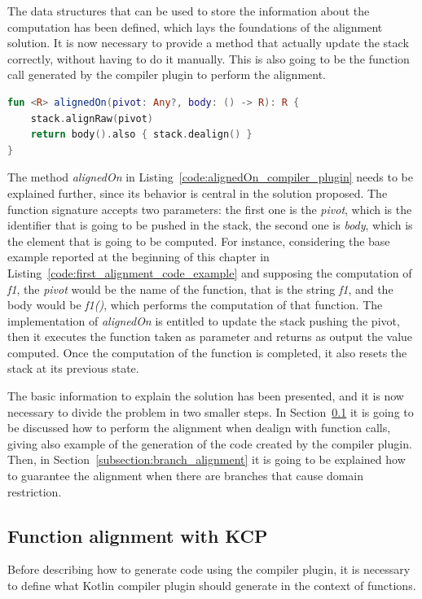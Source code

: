 The data structures that can be used to store the information about the computation has been defined, which lays the foundations of the alignment solution. It is now necessary to provide a method that actually update the stack correctly, without having to do it manually. This is also going to be the function call generated by the compiler plugin to perform the alignment.
\begin{lstlisting}[caption={Function that perfoms the alignment in the Kotlin compiler plugin solution}, captionpos=b, language=Kotlin, label={code:alignedOn_compiler_plugin}]
fun <R> alignedOn(pivot: Any?, body: () -> R): R {
    stack.alignRaw(pivot)
    return body().also { stack.dealign() }
}
\end{lstlisting}
The method \textit{alignedOn} in Listing~\ref{code:alignedOn_compiler_plugin} needs to be explained further, since its behavior is central in the solution proposed.\newline
The function signature accepts two parameters: the first one is the \textit{pivot}, which is the identifier that is going to be pushed in the stack, the second one is \textit{body}, which is the element that is going to be computed.\newline
For instance, considering the base example reported at the beginning of this chapter in Listing~\ref{code:first_alignment_code_example} and supposing the computation of \textit{f1}, the \textit{pivot} would be the name of the function, that is the string \textit{f1}, and the body would be \textit{f1()}, which performs the computation of that function.\newline
The implementation of \textit{alignedOn} is entitled to update the stack pushing the pivot, then it executes the function taken as parameter and returns as output the value computed. Once the computation of the function is completed, it also resets the stack at its previous state.

The basic information to explain the solution has been presented, and it is now necessary to divide the problem in two smaller steps. In Section~\ref{subsection:function_alignment} it is going to be discussed how to perform the alignment when dealign with function calls, giving also example of the generation of the code created by the compiler plugin. Then, in Section~\ref{subsection:branch_alignment} it is going to be explained how to guarantee the alignment when there are branches that cause domain restriction.

\subsection{Function alignment with KCP}\label{subsection:function_alignment}
Before describing how to generate code using the compiler plugin, it is necessary to define what Kotlin compiler plugin should generate in the context of functions.

